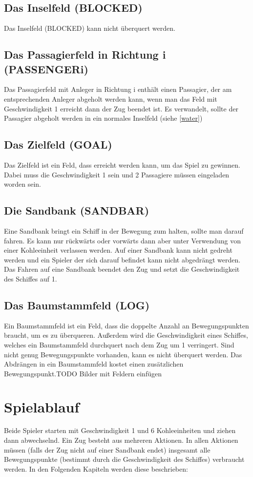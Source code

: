 \documentclass[12pt,a4paper, ngerman, oneside]{scrartcl}
\begin{document}
\subsection{\label{water}Das Inselfeld (BLOCKED)}
Das Inselfeld (BLOCKED) kann nicht überquert werden.
\subsection{Das Passagierfeld in Richtung i (PASSENGERi)}
Das Passagierfeld mit Anleger in Richtung i enthält einen Passagier, der am entsprechenden Anleger abgeholt werden kann, wenn man das Feld mit Geschwindigkeit 1 erreicht dann der Zug beendet ist. Es verwandelt, sollte der Passagier abgeholt werden in ein normales Inselfeld (siehe \ref{water})
\subsection{Das Zielfeld (GOAL)}
Das Zielfeld ist ein Feld, dass erreicht werden kann, um das Spiel zu gewinnen. Dabei muss die Geschwindigkeit 1 sein und 2 Passagiere müssen eingeladen worden sein.
\subsection{Die Sandbank (SANDBAR)}
Eine Sandbank bringt ein Schiff in der Bewegung zum halten, sollte man darauf fahren. Es kann nur rückwärts oder vorwärts dann aber unter Verwendung von einer Kohleeinheit verlassen werden. Auf einer Sandbank kann nicht gedreht werden und ein Spieler der sich darauf befindet kann nicht abgedrängt werden. Das Fahren auf eine Sandbank beendet den Zug und setzt die Geschwindigkeit des Schiffes auf 1.
\subsection{Das Baumstammfeld (LOG)}
Ein Baumstammfeld ist ein Feld, dass die doppelte Anzahl an Bewegungspunkten braucht, um es zu überqueren.
Außerdem wird die Geschwindigkeit eines Schiffes, welches ein Baumstammfeld durchquert nach dem Zug um 1 verringert. Sind nicht genug Bewegungspunkte vorhanden, kann es nicht überquert werden. Das Abdrängen in ein Baumstammfeld kostet einen zusätzlichen Bewegungspunkt.TODO Bilder mit Feldern einfügen

\section{Spielablauf}
Beide Spieler starten mit Geschwindigkeit 1 und 6 Kohleeinheiten und ziehen dann abwechselnd. Ein Zug besteht aus mehreren Aktionen. In allen Aktionen müssen (falls der Zug nicht auf einer Sandbank endet) insgesamt alle Bewegungspunkte (bestimmt durch die Geschwindigkeit des Schiffes) verbraucht werden. In den Folgenden Kapiteln werden diese beschrieben:
\end{document}
